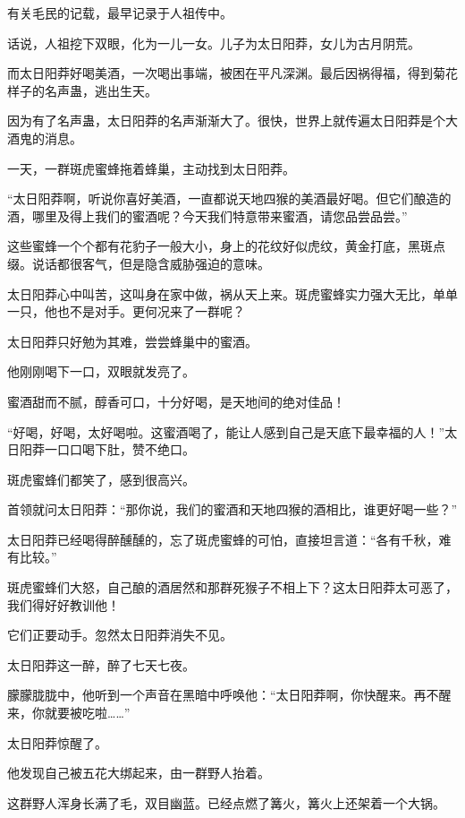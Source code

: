 
\begin{this_body}



有关毛民的记载，最早记录于人祖传中。

话说，人祖挖下双眼，化为一儿一女。儿子为太日阳莽，女儿为古月阴荒。

而太日阳莽好喝美酒，一次喝出事端，被困在平凡深渊。最后因祸得福，得到菊花样子的名声蛊，逃出生天。

因为有了名声蛊，太日阳莽的名声渐渐大了。很快，世界上就传遍太日阳莽是个大酒鬼的消息。

一天，一群斑虎蜜蜂拖着蜂巢，主动找到太日阳莽。

“太日阳莽啊，听说你喜好美酒，一直都说天地四猴的美酒最好喝。但它们酿造的酒，哪里及得上我们的蜜酒呢？今天我们特意带来蜜酒，请您品尝品尝。”

这些蜜蜂一个个都有花豹子一般大小，身上的花纹好似虎纹，黄金打底，黑斑点缀。说话都很客气，但是隐含威胁强迫的意味。

太日阳莽心中叫苦，这叫身在家中做，祸从天上来。斑虎蜜蜂实力强大无比，单单一只，他也不是对手。更何况来了一群呢？

太日阳莽只好勉为其难，尝尝蜂巢中的蜜酒。

他刚刚喝下一口，双眼就发亮了。

蜜酒甜而不腻，醇香可口，十分好喝，是天地间的绝对佳品！

“好喝，好喝，太好喝啦。这蜜酒喝了，能让人感到自己是天底下最幸福的人！”太日阳莽一口口喝下肚，赞不绝口。

斑虎蜜蜂们都笑了，感到很高兴。

首领就问太日阳莽：“那你说，我们的蜜酒和天地四猴的酒相比，谁更好喝一些？”

太日阳莽已经喝得醉醺醺的，忘了斑虎蜜蜂的可怕，直接坦言道：“各有千秋，难有比较。”

斑虎蜜蜂们大怒，自己酿的酒居然和那群死猴子不相上下？这太日阳莽太可恶了，我们得好好教训他！

它们正要动手。忽然太日阳莽消失不见。

太日阳莽这一醉，醉了七天七夜。

朦朦胧胧中，他听到一个声音在黑暗中呼唤他：“太日阳莽啊，你快醒来。再不醒来，你就要被吃啦……”

太日阳莽惊醒了。

他发现自己被五花大绑起来，由一群野人抬着。

这群野人浑身长满了毛，双目幽蓝。已经点燃了篝火，篝火上还架着一个大锅。


\end{this_body}
